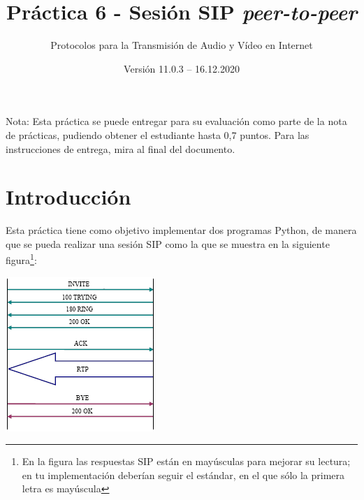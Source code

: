 \documentclass[a4paper,11pt]{article}
\begin{document}
\title{Práctica 6 - Sesión SIP \emph{peer-to-peer}}
\author{Protocolos para la Transmisión de Audio y Vídeo en Internet}
\date{Versión 11.0.3 -- 16.12.2020}



\maketitle
\thispagestyle{empty}



Nota: Esta práctica se puede entregar para su evaluación como parte de la nota de prácticas, pudiendo obtener el estudiante hasta 0,7 puntos. Para las instrucciones de entrega, mira al final del documento.

\section*{Introducción}

Esta práctica tiene como objetivo implementar dos programas Python,
de manera que se pueda realizar una sesión SIP como la que se
muestra en la siguiente figura\footnote{En la figura las respuestas SIP están en 
mayúsculas para mejorar su lectura; en tu implementación deberían seguir el 
estándar, en el que sólo la primera letra es mayúscula}:

\begin{center}
\includegraphics{figs/sip-invite.png}
\end{center}
\end{document}
